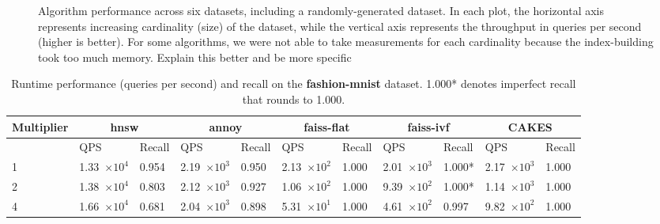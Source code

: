 \begin{figure}
\begin{subfigure}[b]{0.47\textwidth}
\label{fig:results:random-scaling}
\end{subfigure}%


\caption{Algorithm performance across six datasets, including a randomly-generated dataset. In each plot, the horizontal axis represents increasing cardinality (size) of the dataset, while the vertical axis represents the throughput in queries per second (higher is better). For some algorithms, we were not able to take measurements for each cardinality because the index-building took too much memory. {\color{red} Explain this better and be more specific} }
\label{fig:results:scaling-plots}
\end{figure}


\begin{table}[!t]
    \caption{Runtime performance (queries per second) and recall on the \textbf{fashion-mnist} dataset. 1.000* denotes imperfect recall that rounds to 1.000.}
    \label{table:results:ann-fashion}
    \vskip 0.15in
    \begin{center}
        \begin{small}
            \begin{sc}
                \begin{tabular}{|l|p{1.2cm}|p{0.8cm}|p{1.2cm}|p{0.8cm}|p{1.2cm}|p{0.8cm}|p{1.2cm}|p{0.8cm}|p{1.2cm}|p{0.8cm}|}
                    \hline
                    \textbf{Multiplier}  & \multicolumn{2}{|c|}{\textbf{hnsw}} & \multicolumn{2}{|c|}{\textbf{annoy}} & \multicolumn{2}{|c|}{\textbf{faiss-flat}} & \multicolumn{2}{|c|}{\textbf{faiss-ivf}}  & \multicolumn{2}{|c|}{\textbf{CAKES}} \\
                    \hline
                    &             QPS & Recall        & QPS & Recall      & QPS & Recall       & QPS & Recall     & QPS & Recall    \\
                    \hline
                    1   & 1.33~$\times10^{4}$ & 0.954 & 2.19~$\times10^{3}$ & 0.950 & 2.13~$\times10^{2}$  & 1.000 & 2.01~$\times10^{3}$ & 1.000* & 2.17~$\times10^{3}$ & 1.000 \\
                    \hline
                    2   & 1.38~$\times10^{4}$ & 0.803 & 2.12~$\times10^{3}$ & 0.927 & 1.06~$\times10^{2}$  & 1.000 & 9.39~$\times10^{2}$ & 1.000* & 1.14~$\times10^{3}$ & 1.000 \\
                    \hline
                    4   & 1.66~$\times10^{4}$ & 0.681 & 2.04~$\times10^{3}$ & 0.898 & 5.31~$\times10^{1}$  & 1.000 & 4.61~$\times10^{2}$ & 0.997  & 9.82~$\times10^{2}$ & 1.000 \\

\end{tabular}
\end{sc}
\end{small}
\end{center}
\end{table}
